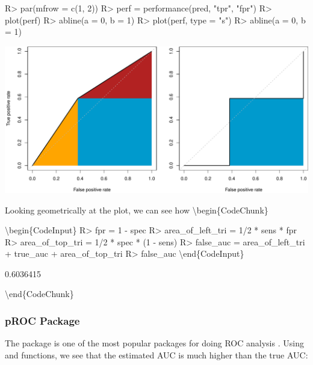 \documentclass[article]{jss}
\begin{document}
\begin{CodeChunk}

\begin{CodeInput}
R> par(mfrow = c(1, 2))
R> perf = performance(pred, "tpr", "fpr")
R> plot(perf)
R> abline(a = 0, b = 1)
R> plot(perf, type = "s")
R> abline(a = 0, b = 1)
\end{CodeInput}
\end{CodeChunk}

\begin{CodeChunk}


\begin{center}\includegraphics{index_files/figure-latex/unnamed-chunk-10-1} \end{center}

\end{CodeChunk}

Looking geometrically at the plot, we can see how
\textbackslash{}begin\{CodeChunk\}

\textbackslash{}begin\{CodeInput\} R\textgreater{} fpr = 1 - spec
R\textgreater{} area\_of\_left\_tri = 1/2 * sens * fpr R\textgreater{}
area\_of\_top\_tri = 1/2 * spec * (1 - sens) R\textgreater{} false\_auc
= area\_of\_left\_tri + true\_auc + area\_of\_top\_tri R\textgreater{}
false\_auc \textbackslash{}end\{CodeInput\}

\begin{CodeOutput}
[1] 0.6036415
\end{CodeOutput}

\textbackslash{}end\{CodeChunk\}

\hypertarget{proc-package}{%
\subsubsection{pROC Package}\label{proc-package}}

The  package is one of the most popular packages for doing ROC
analysis \citep{pROC}. Using  and 
functions, we see that the estimated AUC is much higher than the true
AUC:
\end{document}
